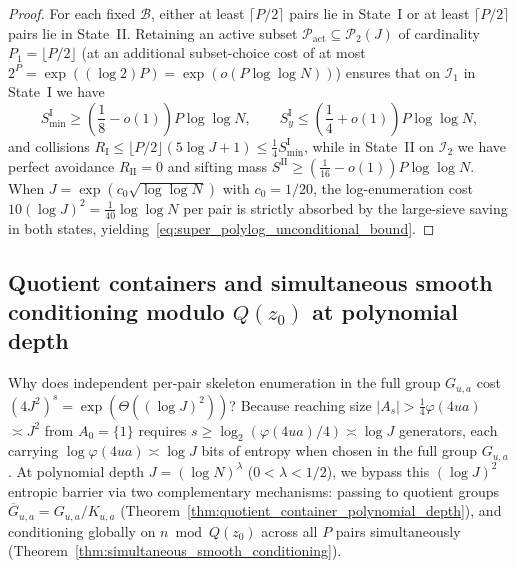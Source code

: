 \documentclass[11pt, a4paper]{article}
\theoremstyle{plain}
\theoremstyle{definition}
\begin{document}
\begin{proof}
For each fixed $\mathcal{B}$, either at least $\lceil P/2\rceil$ pairs lie in State~I or at least $\lceil P/2\rceil$ pairs lie in State~II. Retaining an active subset $\mathcal{P}_{\mathrm{act}}\subseteq\mathcal{P}_2(J)$ of cardinality $P_1=\lfloor P/2\rfloor$ (at an additional subset-choice cost of at most $2^{P}=\exp((\log 2)P)=\exp(o(P\log\log N))$) ensures that on $\mathcal{I}_1$ in State~I we have 
\[
S_{\min}^{\mathrm{I}}\ge\left(\frac18-o(1)\right)P\log\log N,\qquad S_y^{\mathrm{I}}\le\left(\frac14+o(1)\right)P\log\log N,
\]
and collisions $R_{\mathrm{I}}\le\lfloor P/2\rfloor(5\log J+1)\le\frac14 S_{\min}^{\mathrm{I}}$, while in State~II on $\mathcal{I}_2$ we have perfect avoidance $R_{\mathrm{II}}=0$ and sifting mass $S^{\mathrm{II}}\ge(\frac{1}{16}-o(1))P\log\log N$. When $J=\exp(c_0\sqrt{\log\log N})$ with $c_0=1/20$, the log-enumeration cost $10(\log J)^{2}=\frac{1}{40}\log\log N$ per pair is strictly absorbed by the large-sieve saving in both states, yielding~\eqref{eq:super_polylog_unconditional_bound}.
\end{proof}

\subsection{Quotient containers and simultaneous smooth conditioning modulo $Q(z_0)$ at polynomial depth}\label{subsec:quotient_and_smooth_conditioning}

Why does independent per-pair skeleton enumeration in the full group $G_{u,a}$ cost $(4J^{2})^{s}=$\linebreak $\exp(\Theta((\log J)^{2}))$? Because reaching size $|A_s|>\frac14\varphi(4ua)$ $\asymp J^{2}$ from $A_0=\{1\}$ requires $s\ge\log_2(\varphi(4ua)/4)\asymp\log J$ generators, each carrying $\log\varphi(4ua)\asymp\log J$ bits of entropy when chosen in the full group $G_{u,a}$. At polynomial depth $J=(\log N)^{\lambda}$ ($0<\lambda<1/2$), we bypass this $(\log J)^{2}$ entropic barrier via two complementary mechanisms: passing to quotient groups $\overline{G}_{u,a}=G_{u,a}/K_{u,a}$ (Theorem~\ref{thm:quotient_container_polynomial_depth}), and conditioning globally on $n\bmod Q(z_0)$ across all $P$ pairs simultaneously (Theorem~\ref{thm:simultaneous_smooth_conditioning}).
\end{document}
